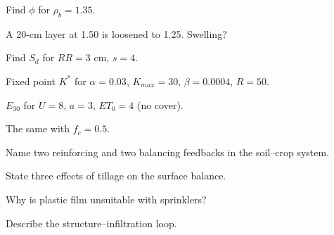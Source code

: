 \begin{exlist}
\item Find $\phi$ for $\rho_b=1.35$.
\item A 20-cm layer at 1.50 is loosened to 1.25. Swelling?\exans{4.0 cm}
\item Find $S_d$ for $RR=3$ cm, $s=4$.\exans{0.47 mm}
\item Fixed point $K^*$ for $\alpha=0.03$, $K_{max}=30$, $\beta=0.0004$, $R=50$.
\item $E_{30}$ for $U=8$, $a=3$, $ET_0=4$ (no cover).\exans{20.2 mm}
\item The same with $f_c=0.5$.\exans{10.1 mm}
\item Name two reinforcing and two balancing feedbacks in the soil--crop system.
\item State three effects of tillage on the surface balance.
\item Why is plastic film unsuitable with sprinklers?
\item Describe the structure--infiltration loop.
\end{exlist}
